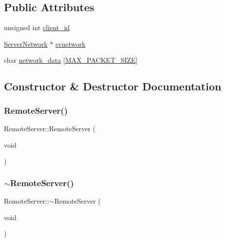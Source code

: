 \subsection*{Public Attributes}
\begin{DoxyCompactItemize}
\item 
unsigned int \mbox{\hyperlink{class_remote_server_a111deb3aa24baa094cc709854e489622}{client\+\_\+id}}
\item 
\mbox{\hyperlink{class_server_network}{Server\+Network}} $\ast$ \mbox{\hyperlink{class_remote_server_affc39f22472abb8f9ff319f1319f3bdb}{svnetwork}}
\item 
char \mbox{\hyperlink{class_remote_server_a881760eeafe5ee6209650459c7440473}{network\+\_\+data}} \mbox{[}\mbox{\hyperlink{_network_data_8h_a879456c3b8e2853f7044d764e9c180d4}{M\+A\+X\+\_\+\+P\+A\+C\+K\+E\+T\+\_\+\+S\+I\+ZE}}\mbox{]}
\end{DoxyCompactItemize}


\subsection{Constructor \& Destructor Documentation}
\mbox{\label{class_remote_server_a3b4c9192a1b511a8394febedfb15810a}} 
\subsubsection{\texorpdfstring{Remote\+Server()}{RemoteServer()}}
{\footnotesize\ttfamily Remote\+Server\+::\+Remote\+Server (\begin{DoxyParamCaption}\item[{void}]{ }\end{DoxyParamCaption})}

\mbox{\label{class_remote_server_ad05c217f363f338dcd05fb319c905f7e}} 
\subsubsection{\texorpdfstring{$\sim$\+Remote\+Server()}{~RemoteServer()}}
{\footnotesize\ttfamily Remote\+Server\+::$\sim$\+Remote\+Server (\begin{DoxyParamCaption}\item[{void}]{ }\end{DoxyParamCaption})}



